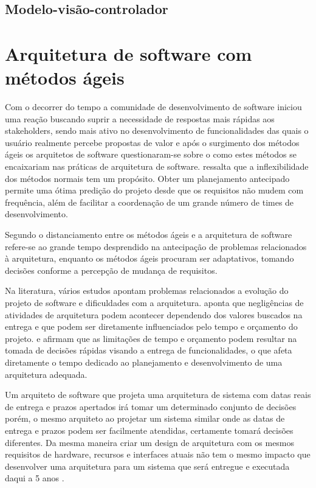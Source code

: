 \subsection{Modelo-visão-controlador}


\section{Arquitetura de software com métodos ágeis}


Com o decorrer do tempo a comunidade de desenvolvimento de software iniciou uma reação buscando suprir a necessidade de respostas mais rápidas aos stakeholders, sendo mais ativo no desenvolvimento de funcionalidades das quais o usuário realmente percebe propostas de valor e após o surgimento dos métodos ágeis os arquitetos de software questionaram-se sobre o como estes métodos se encaixariam nas práticas de arquitetura de software. \cite{babar2013agile} ressalta que a inflexibilidade dos métodos normais tem um propósito. Obter um planejamento antecipado permite uma ótima predição do projeto desde que os requisitos não mudem com frequência, além de facilitar a coordenação de um grande número de times de desenvolvimento.


Segundo \cite{abrahamsson2010agility} o distanciamento entre os métodos ágeis e a arquitetura de software refere-se ao grande tempo desprendido na antecipação de problemas relacionados à arquitetura, enquanto os métodos ágeis procuram ser adaptativos, tomando decisões conforme a percepção de mudança de requisitos. 

Na literatura, vários estudos apontam problemas relacionados a evolução do projeto de software e dificuldades com a arquitetura. \cite{waterman2015much} aponta que negligências de atividades de arquitetura podem acontecer dependendo dos valores buscados na entrega e que podem ser diretamente influenciados pelo tempo e orçamento do projeto. \cite{martini2015investigating} e \cite{bellomo2013study} afirmam que as limitações de tempo e orçamento podem resultar na tomada de decisões rápidas visando a entrega de funcionalidades, o que afeta diretamente o tempo dedicado ao planejamento e desenvolvimento de uma arquitetura adequada.

Um arquiteto de software que projeta uma arquitetura de sistema com datas reais de entrega e prazos apertados irá tomar um determinado conjunto de decisões porém, o mesmo arquiteto ao projetar um sistema similar onde as datas de entrega e prazos podem ser facilmente atendidas, certamente tomará decisões diferentes. Da mesma maneira criar um design de arquitetura com os mesmos requisitos de hardware, recursos e interfaces atuais não tem o mesmo impacto que desenvolver uma arquitetura para um sistema que será entregue e executada daqui a 5 anos \cite{bass2007software}.

